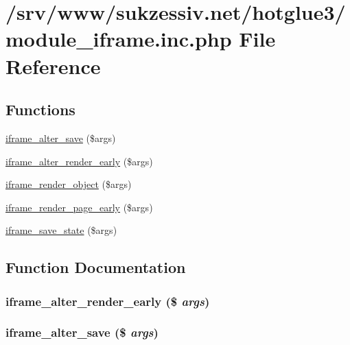 \hypertarget{module__iframe_8inc_8php}{
\section{/srv/www/sukzessiv.net/hotglue3/module\_\-iframe.inc.php File Reference}
\label{module__iframe_8inc_8php}
}
\subsection*{Functions}
\begin{CompactItemize}
\item 
\hyperlink{module__iframe_8inc_8php_2db93d83522681e256287e019fe40abc}{iframe\_\-alter\_\-save} (\$args)
\item 
\hyperlink{module__iframe_8inc_8php_7a5d09a45f06d9fd866f3c7679c14db2}{iframe\_\-alter\_\-render\_\-early} (\$args)
\item 
\hyperlink{module__iframe_8inc_8php_40856482f79fb837bc538e8eed66aff4}{iframe\_\-render\_\-object} (\$args)
\item 
\hyperlink{module__iframe_8inc_8php_d4d8fd8256a19beb570193c2886659e5}{iframe\_\-render\_\-page\_\-early} (\$args)
\item 
\hyperlink{module__iframe_8inc_8php_3034fcc475334b511b91932918fcfe57}{iframe\_\-save\_\-state} (\$args)
\end{CompactItemize}


\subsection{Function Documentation}
\hypertarget{module__iframe_8inc_8php_7a5d09a45f06d9fd866f3c7679c14db2}{
\subsubsection[{iframe\_\-alter\_\-render\_\-early}]{\setlength{\rightskip}{0pt plus 5cm}iframe\_\-alter\_\-render\_\-early (\$ {\em args})}}
\label{module__iframe_8inc_8php_7a5d09a45f06d9fd866f3c7679c14db2}


\hypertarget{module__iframe_8inc_8php_2db93d83522681e256287e019fe40abc}{
\subsubsection[{iframe\_\-alter\_\-save}]{\setlength{\rightskip}{0pt plus 5cm}iframe\_\-alter\_\-save (\$ {\em args})}}
\label{module__iframe_8inc_8php_2db93d83522681e256287e019fe40abc}


